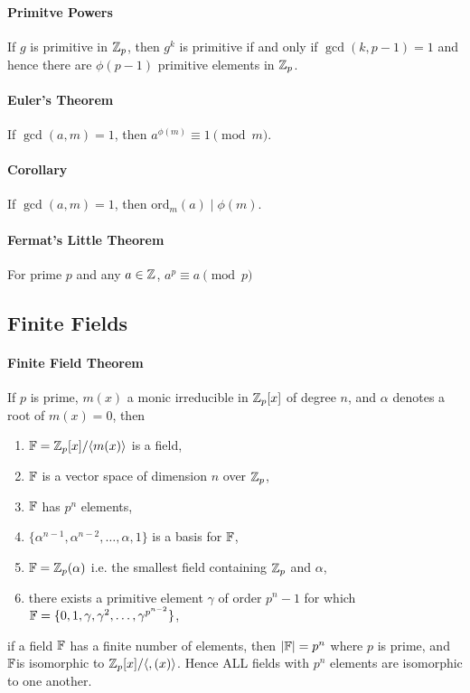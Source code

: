 \paragraph{Primitve Powers}
If \(g\) is primitive in \(\mathbb{Z}_p\), then \(g^k\) is primitive if and only if \(\gcd(k, p - 1) = 1\) and hence there are \(\phi(p - 1)\) primitive elements in \(\mathbb{Z}_p\).

\paragraph{Euler's Theorem}
If \(\gcd(a, m) = 1\), then \(a^{\phi(m)} \equiv 1 \pmod m\).

\paragraph{Corollary} If \(\gcd(a, m) = 1\), then \(\mathrm{ord}_m(a) \mid \phi(m)\).

\paragraph{Fermat's Little Theorem}
For prime \(p\) and any \(a \in \mathbb{Z}\), \(a^p \equiv a \pmod p\)

\subsection{Finite Fields}
\paragraph{Finite Field Theorem}
If \(p\) is prime, \(m(x)\) a monic irreducible in \(\mathbb{Z}_p[x]\) of degree \(n\), and \(\alpha\) denotes a root of \(m(x) = 0\), then
\begin{enumerate}
    \item \(\mathbb{F} = \mathbb{Z}_p[x] / \langle m(x) \rangle\) is a field,
    \item \(\mathbb{F}\) is a vector space of dimension \(n\) over \(\mathbb{Z}_p\),
    \item \(\mathbb{F}\) has \(p^n\) elements,
    \item \(\{\alpha^{n - 1}, \alpha^{n - 2}, \dots, \alpha, 1 \}\) is a basis for \(\mathbb{F}\),
    \item \(\mathbb{F} = \mathbb{Z}_p (\alpha)\) i.e. the smallest field containing \(\mathbb{Z}_p\) and \(\alpha\),
    \item there exists a primitive element \(\gamma\) of order \(p^n - 1\) for which \(\mathbb{F} = \{0, 1, \gamma, \gamma^2, \dots, \gamma^{p^{n - 2}}\}\),
\end{enumerate}
if a field \(\mathbb{F}\) has a finite number of elements, then \(|\mathbb{F}| = p^n\) where \(p\) is prime, and \(\mathbb{F}\)is isomorphic to \(\mathbb{Z}_p[x] / \langle ,(x) \rangle\). Hence ALL fields with \(p^n\) elements are isomorphic to one another.


